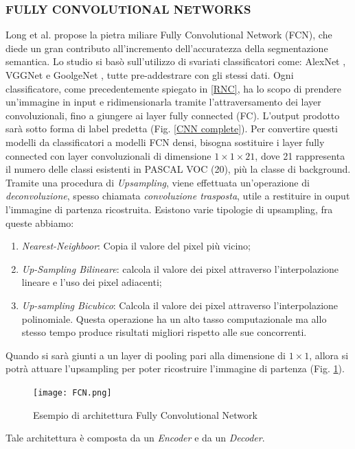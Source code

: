 \subsubsection{FULLY CONVOLUTIONAL NETWORKS}
Long et al. \cite{fcn} propose la pietra miliare Fully Convolutional Network (FCN), 
che diede un gran contributo all’incremento dell’accuratezza della segmentazione 
semantica. Lo studio si basò sull’utilizzo di svariati classificatori come: AlexNet \cite{alexnet}, 
VGGNet\cite{vggNet} e GoolgeNet \cite{googleNet}, tutte pre-addestrare con gli stessi dati. 
Ogni classificatore, come precedentemente spiegato in \ref{RNC}, ha lo scopo di prendere 
un'immagine in input e ridimensionarla tramite l’attraversamento dei layer 
convoluzionali, fino a giungere ai layer fully connected (FC). L’output prodotto 
sarà sotto forma di label predetta (Fig. \ref{CNN complete}). Per convertire questi modelli da 
classificatori a modelli FCN densi, bisogna sostituire i layer fully connected con 
layer convoluzionali di dimensione $1 \times 1 \times 21$, dove 21 rappresenta il numero delle 
classi esistenti in PASCAL VOC (20), più la classe di background. Tramite una 
procedura di \emph{Upsampling}, viene effettuata un’operazione di \emph{deconvoluzione}, spesso 
chiamata \emph{convoluzione trasposta}, utile a restituire in ouput l’immagine di partenza 
ricostruita. Esistono varie tipologie di upsampling, fra queste abbiamo:
\begin{enumerate}
    \item \emph{Nearest-Neighboor}: Copia il valore del pixel più vicino;
    \item \emph{Up-Sampling Bilineare}: calcola il valore dei pixel attraverso l’interpolazione lineare e l’uso dei pixel adiacenti;
    \item \emph{Up-sampling Bicubico}: Calcola il valore dei pixel attraverso l’interpolazione polinomiale. Questa operazione ha un alto tasso computazionale ma allo stesso tempo produce risultati migliori rispetto alle sue concorrenti. 
\end{enumerate}
Quando si sarà giunti a un layer di pooling pari alla dimensione di $1 \times 1$, allora 
si potrà attuare l’upsampling per poter ricostruire l’immagine di partenza (Fig. \ref{FCN}). 
\begin{figure}
    \centering
    \texttt{[image: FCN.png]}
    \centering
    \caption{Esempio di architettura Fully Convolutional Network}
    \label{FCN}
\end{figure}
Tale architettura è composta da un \emph{Encoder} e da un \emph{Decoder}.
